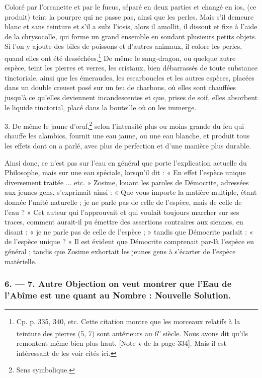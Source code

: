 \documentclass[a4paper, 11pt, oneside, polutonikogreek, french]{article}
\begin{document}
Coloré par l'orcanette et par le fucus, séparé en deux parties et changé en ios, (ce produit) teint la pourpre qui ne passe pas, ainsi que les perles. Mais s'il demeure blanc et sans teinture et s'il a subi l'iosis, alors il amollit, il dissout et fixe à l'aide de la chrysocolle, qui forme un grand ensemble en soudant plusieurs petits objets. Si l'on y ajoute des biles de poissons et d'autres animaux, il colore les perles, quand elles ont été desséchées.\footnote{Cp. p. 335, 340, etc. Cette citation montre que les morceaux relatifs à la teinture des pierres (5, 7) sont antérieurs au 6\textsuperscript{e} siècle. Nous avons dit qu'ils remontent même bien plus haut. [Note $\star$ de la page 334]. Mais il est intéressant de les voir cités ici.} De même le sang-dragon, ou quelque autre espèce, teint les pierres et verres, les cristaux, bien débarrassés de toute substance tinctoriale, ainsi que les émeraudes, les escarboucles et les autres espèces, placées dans un double creuset posé sur un feu de charbons, où elles sont chauffées jusqu'à ce qu'elles deviennent incandescentes et que, prises de soif, elles absorbent le liquide tinctorial, placé dans la bouteille où on les immerge.

3. De même le jaune d'œuf,\footnote{Sens symbolique.} selon l'intensité plus ou moins grande du feu qui chauffe les alambics, fournit une eau jaune, ou une eau blanche, et produit tous les effets dont on a parlé, avec plus de perfection et d'une manière plus durable.

Ainsi donc, ce n'est pas sur l'eau en général que porte l'explication actuelle du Philosophe, mais sur une eau spéciale, lorsqu'il dit : « En effet l'espèce unique diversement traitée ... etc. » Zosime, louant les paroles de Démocrite, adressées aux jeunes gens, s'exprimait ainsi : « Que vous importe la matière multiple, étant donnée l'unité naturelle ; je ne parle pas de celle de l'espèce, mais de celle de l'eau ? » Cet auteur qui l'approuvait et qui voulait toujours marcher sur ses traces, comment aurait-il pu émettre des assertions contraires aux siennes, en disant : « je ne parle pas de celle de l'espèce ; » tandis que Démocrite parlait : « de l'espèce unique ? » Il est évident que Démocrite comprenait par-là l'espèce en général ; tandis que Zosime exhortait les jeunes gens à s'écarter de l'espèce matérielle.

\bigskip
\centerline{\EightStarTaper}
\centerline{\EightStarTaper\EightStarTaper}
\bigskip

\subsubsection{6. --- 7. Autre Objection on veut montrer que l'Eau de l'Abîme est une quant au Nombre : Nouvelle Solution.}
\end{document}
